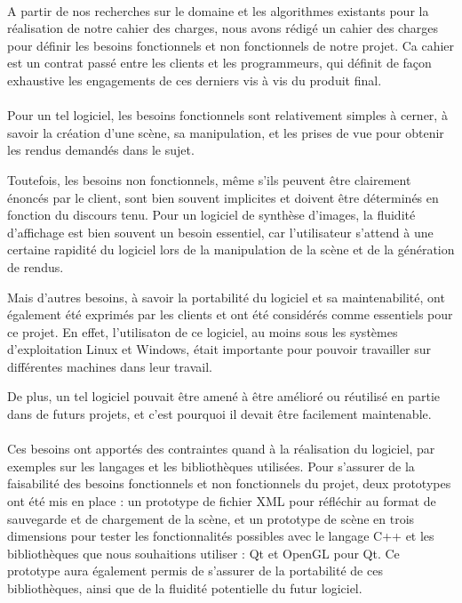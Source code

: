 \paragraph{}
        A partir de nos recherches sur le domaine et les algorithmes existants pour la réalisation de notre cahier des charges, nous avons rédigé un cahier des charges pour définir les besoins fonctionnels et non fonctionnels de notre projet. Ca cahier est un contrat passé entre les clients et les programmeurs, qui définit de façon exhaustive les engagements de ces derniers vis à vis du produit final.
\paragraph{}
        Pour un tel logiciel, les besoins fonctionnels sont relativement simples à cerner, à savoir la création d'une scène, sa manipulation, et les prises de vue pour obtenir les rendus demandés dans le sujet. 
        
        Toutefois, les besoins non fonctionnels, même s'ils peuvent être clairement énoncés par le client, sont bien souvent implicites et doivent être déterminés en fonction du discours tenu. Pour un logiciel de synthèse d'images, la fluidité d'affichage est bien souvent un besoin essentiel, car l'utilisateur s'attend à une certaine rapidité du logiciel lors de la manipulation de la scène et de la génération de rendus. 
        
        Mais d'autres besoins, à savoir la portabilité du logiciel et sa maintenabilité, ont également été exprimés par les clients et ont été considérés comme essentiels pour ce projet. En effet, l'utilisaton de ce logiciel, au moins sous les systèmes d'exploitation Linux et Windows, était importante pour pouvoir travailler sur différentes machines dans leur travail. 
        
        De plus, un tel logiciel pouvait être amené à être amélioré ou réutilisé en partie dans de futurs projets, et c'est pourquoi il devait être facilement maintenable.

\paragraph{}
        Ces besoins ont apportés des contraintes quand à la réalisation du logiciel, par exemples sur les langages et les bibliothèques utilisées.
        Pour s'assurer de la faisabilité des besoins fonctionnels et non fonctionnels du projet, deux prototypes ont été mis en place : un prototype de fichier XML pour réfléchir au format de sauvegarde et de chargement de la scène, et un prototype de scène en trois dimensions pour tester les fonctionnalités possibles avec le langage C++ et les bibliothèques que nous souhaitions utiliser : Qt et OpenGL pour Qt. Ce prototype aura également permis de s'assurer de la portabilité de ces bibliothèques, ainsi que de la fluidité potentielle du futur logiciel.

